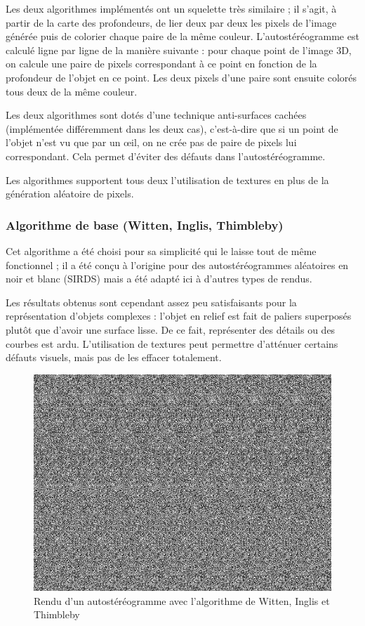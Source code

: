 
  Les deux algorithmes implémentés ont un squelette très similaire ; il s'agit, à partir de la carte des profondeurs, de lier deux par deux les pixels de l'image générée puis de colorier chaque paire de la même couleur. L'autostéréogramme est calculé ligne par ligne de la manière suivante : pour chaque point de l'image 3D, on calcule une paire de pixels correspondant à ce point en fonction de la profondeur de l'objet en ce point. Les deux pixels d'une paire sont ensuite colorés tous deux de la même couleur. 

  Les deux algorithmes sont dotés d'une technique anti-surfaces cachées (implémentée différemment dans les deux cas), c'est-à-dire que si un point de l'objet n'est vu que par un \oe il, on ne crée pas de paire de pixels lui correspondant. Cela permet d'éviter des défauts dans l'autostéréogramme.

  Les algorithmes supportent tous deux l'utilisation de textures en plus de la génération aléatoire de pixels. 
  
  \subsubsection{Algorithme de base (Witten, Inglis, Thimbleby)}

  Cet algorithme a été choisi pour sa simplicité qui le laisse tout de même fonctionnel ; il a été conçu à l'origine pour des autostéréogrammes aléatoires en noir et blanc (SIRDS) mais a été adapté ici à d'autres types de rendus.

  Les résultats obtenus sont cependant assez peu satisfaisants pour la représentation d'objets complexes : l'objet en relief est fait de paliers superposés plutôt que d'avoir une surface lisse. De ce fait, représenter des détails ou des courbes est ardu. L'utilisation de textures peut permettre d'atténuer certains défauts visuels, mais pas de les effacer totalement.

\begin{figure}[h]
	\centering
	\includegraphics[scale=0.6]{autoste1.png}
	\caption{\label{fig:autoste1} Rendu d'un autostéréogramme avec l'algorithme de Witten, Inglis et Thimbleby \protect}
\end{figure}

